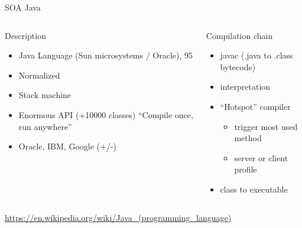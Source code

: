 %
\begin{Frame}{SOA Java}
  \begin{columns}[t]
    \begin{column}{5cm} %
      \begin{block}{Description}
        \begin{itemize}
        \item Java Language (Sun microsystems / Oracle), 95
        \item Normalized
        \item Stack machine
        \item Enormous API (+10000 classes) ``Compile once, run anywhere''
        \item Oracle, IBM, Google (+/-)
        \end{itemize}
      \end{block} 
    \end{column}
    
    \begin{column}{5cm} %
      \begin{block}{Compilation chain}
        \begin{itemize}
        \item javac (.java to .class bytecode)
        \item interpretation
        \item ``Hotspot'' compiler\TBD
          \begin{itemize}
          \item trigger most used method
          \item server or client profile
          \end{itemize}
        \item class to executable
        \end{itemize}
      \end{block}   
    \end{column}
  \end{columns}  
\url{https://en.wikipedia.org/wiki/Java_(programming_language)}
\end{Frame}


